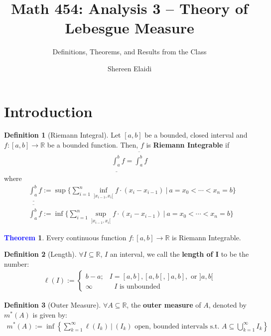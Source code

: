 \documentclass[11pt]{article}
\title{\textbf{Math 454: Analysis 3 -- Theory of Lebesgue Measure}\vspace{-2ex}}
\author{Definitions, Theorems, and Results from the Class\vspace{-2ex}}
\date{Shereen Elaidi}
\theoremstyle{definition}
\newcommand{\bb}[1]{\mathbb{#1}}
\newtheorem{theorem}{\textcolor{blue}{Theorem}}
\theoremstyle{definition}
\newtheorem{definition}{\textcolor{OliveGreen}{Definition}}
\theoremstyle{remark}
\newcommand{\upRiemannint}[2]{
  \overline{\int_{#1}^{#2}}
}
\newcommand{\loRiemannint}[2]{
  \underline{\int_{#1}^{#2}}
}
\begin{document}
\maketitle 



\section{Introduction}

\begin{definition}[Riemann Integral]
	Let $[a,b]$ be a bounded, closed interval and $f: [a, b] \rightarrow \bb{R}$ be a bounded function. Then, $f$ is \textbf{Riemann Integrable} if 
	\begin{align}
		\loRiemannint{a}{b} f = \upRiemannint{a}{b} f
	\end{align}
	where
	\begin{align}
		& \loRiemannint{a}{b} f := \sup \bigg\{ 	\sum_{i=1}^n \inf_{]x_{i-1}, x_i[} f \cdot (x_i - x_{i-1} )\ \bigg|\ a = x_0 < \cdots < x_n =b		\bigg\}  \\
		& \upRiemannint{a}{b} f := \inf \bigg\{ 	\sum_{i=1}^n \sup_{]x_{i-1}, x_i[} f \cdot (x_i - x_{i-1} )\ \bigg|\ a = x_0 < \cdots < x_n =b		\bigg\} 	
	\end{align}
\end{definition}

\begin{theorem}
	Every continuous function $f: [a,b] \rightarrow \bb{R}$ is Riemann Integrable. 
\end{theorem}

\begin{definition}[Length]
	$\forall I \subseteq \bb{R}$, $I$ an interval, we call the \textbf{length of I} to be the number: 
	\begin{align}
		\ell(I):= \begin{cases}
			b-a;  & I = [a,b], [a,b[, ]a, b], \mbox{ or } ]a,b[ \\
			\infty &  \mbox{ $I$ is unbounded } 
		\end{cases}
	\end{align}
\end{definition}

\begin{definition}[Outer Measure]
	$\forall A \subseteq \bb{R}$, the \textbf{outer measure} of $A$, denoted by $m^*(A)$ is given by: 
	\begin{align}
		m^*(A) := \inf \left\{ 	\sum_{k=1}^\infty \ell(I_k)\ \bigg|\ (I_k) \mbox{ open, bounded intervals s.t. } A \subseteq \bigcup_{k=1}^\infty I_k		\right\} 
	\end{align}
\end{definition}
\end{document}
